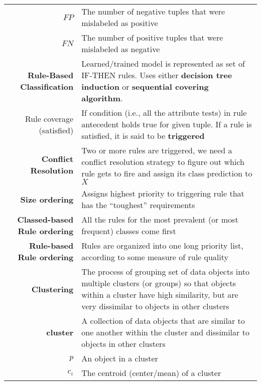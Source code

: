 \documentclass{article}
\begin{document}
\begin{longtable}{Rp{13cm}}
                 $FP$ & The number of negative tuples that were mislabeled as positive\\

                 $FN$ & The number of positive tuples that were mislabeled as negative\\

                 \textbf{Rule-Based Classification} & Learned/trained model is represented as set of IF-THEN rules. Uses either \textbf{decision tree induction} or \textbf{sequential covering algorithm}.\\

                 Rule coverage (satisfied) & If condition (i.e., all the attribute tests) in rule antecedent holds true for given tuple. If a rule is satisfied, it is said to be \textbf{triggered}\\

                 \textbf{Conflict Resolution} & Two or more rules are triggered, we need a conflict resolution strategy to figure out which rule gets to fire and assign its class prediction to $X$\\

                 \textbf{Size ordering} & Assigns highest priority to triggering rule that has the “toughest” requirements\\

                 \textbf{Classed-based Rule ordering} & All the rules for the most prevalent (or most frequent) classes come first\\

                 \textbf{Rule-based Rule ordering} & Rules are organized into one long priority list, according to some measure of rule quality\\

                 \textbf{Clustering} & The process of grouping set of data objects into multiple clusters (or groups) so that objects within a cluster have high similarity, but are very dissimilar to objects in other clusters\\

                 \textbf{cluster} & A collection of data objects that are similar to one another within the cluster and dissimilar to objects in other clusters\\

                 $p$ & An object in a cluster\\

                 $c_i$ & The centroid (center/mean) of a cluster\\


\end{longtable}
\end{document}

